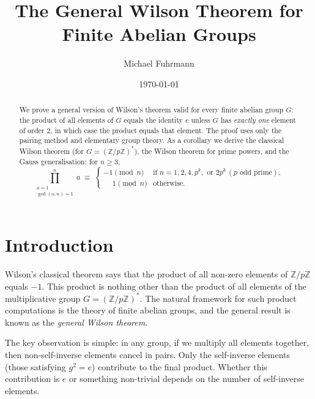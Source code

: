 \documentclass[12pt,a4paper]{amsart}
\theoremstyle{definition}
\newcommand{\Z}{\mathbb{Z}}
\begin{document}

\title{The General Wilson Theorem for Finite Abelian Groups}

\author{Michael Fuhrmann}
\address{Specialist Mathematics Project, Build 65}
\date{\today}

\begin{abstract}
We prove a general version of Wilson's theorem valid for every finite abelian
group $G$: the product of all elements of $G$ equals the identity $e$ unless
$G$ has \emph{exactly one} element of order $2$, in which case the product
equals that element.  The proof uses only the pairing method and elementary
group theory.  As a corollary we derive the classical Wilson theorem
(for $G = (\Z/p\Z)^*$), the Wilson theorem for prime powers, and the
Gauss generalisation: for $n \geq 3$,
\[
  \prod_{\substack{a=1\\\gcd(a,n)=1}}^{n} a
  \;\equiv\;
  \begin{cases}
    -1 \pmod n & \text{if } n = 1, 2, 4, p^k, \text{ or } 2p^k\,(p \text{ odd prime}),\\
    \phantom{-}1 \pmod n & \text{otherwise.}
  \end{cases}
\]
\end{abstract}

\maketitle
\tableofcontents

\section{Introduction}

Wilson's classical theorem says that the product of all non-zero elements of
$\Z/p\Z$ equals $-1$.  This product is nothing other than the product of all
elements of the multiplicative group $G = (\Z/p\Z)^*$.
The natural framework for such product computations is the theory of finite
abelian groups, and the general result is known as the \emph{general Wilson
theorem}.

The key observation is simple: in any group, if we multiply all elements together,
then non-self-inverse elements cancel in pairs.  Only the self-inverse elements
(those satisfying $g^2 = e$) contribute to the final product.  Whether this
contribution is $e$ or something non-trivial depends on the number of
self-inverse elements.
\end{document}
